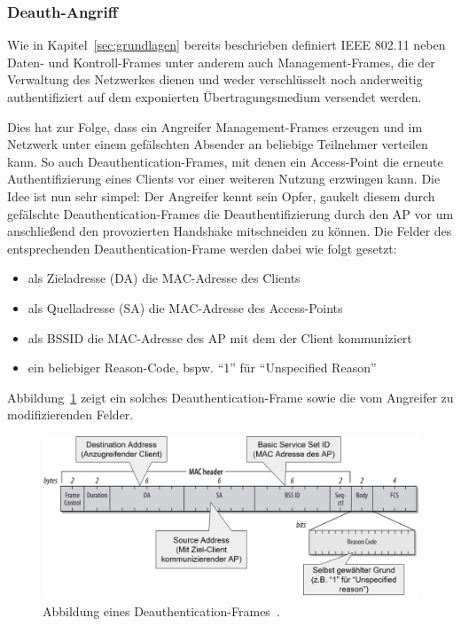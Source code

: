 \subsubsection{Deauth-Angriff}\label{subs:deauth-attack}
Wie in Kapitel~\ref{sec:grundlagen} bereits beschrieben definiert IEEE 802.11 neben Daten- und Kontroll-Frames unter anderem auch Management-Frames, die der Verwaltung des Netzwerkes dienen und weder verschlüsselt noch anderweitig authentifiziert auf dem exponierten Übertragungsmedium versendet werden.

Dies hat zur Folge, dass ein Angreifer Management-Frames erzeugen und im Netzwerk unter einem gefälschten Absender an beliebige Teilnehmer verteilen kann.
So auch Deauthentication-Frames, mit denen ein Access-Point die erneute Authentifizierung eines Clients vor einer weiteren Nutzung erzwingen kann. Die Idee ist nun sehr simpel: Der Angreifer kennt sein Opfer, gaukelt diesem durch gefälschte Deauthentication-Frames die Deauthentifizierung durch den AP vor um anschließend den provozierten Handshake mitschneiden zu können.
Die Felder des entsprechenden Deauthentication-Frame werden dabei wie folgt gesetzt:
\begin{itemize}
	\item als Zieladresse (DA) die MAC-Adresse des Clients
	\item als Quelladresse (SA) die MAC-Adresse des Access-Points
	\item als BSSID die MAC-Adresse des AP mit dem der Client kommuniziert
	\item ein beliebiger Reason-Code, bspw. \enquote{1} für \enquote{Unspecified Reason} \cite[S. 442]{ieee802.11}
\end{itemize}
Abbildung~\ref{fig:deauth-attack} zeigt ein solches Deauthentication-Frame sowie die vom Angreifer zu modifizierenden Felder.

\begin{figure}[ht]
	\centering
	\includegraphics[width=1\textwidth]{graphics/deauth-attack}
	\caption[Deauthentication-Frame]{Abbildung eines Deauthentication-Frames~\cite{deauthframe}.}
	\label{fig:deauth-attack}
\end{figure}

